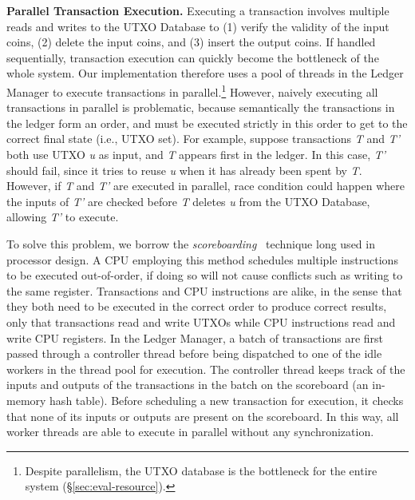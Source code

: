 \noindent\textbf{Parallel Transaction Execution.}
\label{sec:scoreboarding}
Executing a transaction involves multiple reads and writes to the UTXO Database to (1) verify the validity of the input coins, (2) delete the input coins, and (3) insert the output coins. If handled sequentially, transaction execution can quickly become the bottleneck of the whole system. Our implementation therefore uses a pool of threads in the Ledger Manager to execute transactions in parallel.\footnote{Despite parallelism, the UTXO database is the bottleneck for the entire system (\S\ref{sec:eval-resource}).}
However, naively executing all transactions in parallel is problematic, because semantically the transactions in the ledger form an order, and must be executed strictly in this order to get to the correct final state (i.e., UTXO set). For example, suppose  transactions \textit{T} and \textit{T'} both use UTXO \textit{u} as input, and \textit{T} appears first in the ledger. In this case, \textit{T'} should fail, since it tries to reuse \textit{u} when it has already been spent by \textit{T}. However, if \textit{T} and \textit{T'} are executed in parallel, race condition could happen where the inputs of \textit{T'} are checked before \textit{T} deletes \textit{u} from the UTXO Database, allowing \textit{T'} to execute.

To solve this problem, we borrow the \textit{scoreboarding}~\cite{scoreboarding} technique long used in processor design. A CPU employing this method schedules multiple instructions to be executed out-of-order, if doing so will not cause conflicts such as writing to the same register. Transactions and CPU instructions are alike, in the sense that they both need to be executed in the correct order to produce correct results, only that transactions read and write UTXOs while CPU instructions read and write CPU registers. 
In the Ledger Manager, a batch of transactions are first passed through a controller thread before being dispatched to one of the idle workers in the thread pool for execution. The controller thread keeps track of the inputs and outputs of the transactions in the batch on the scoreboard (an in-memory hash table). Before scheduling a new transaction for execution, it checks that none of its inputs or outputs are present on the scoreboard. In this way, all worker threads are able to execute in parallel without any synchronization. 

